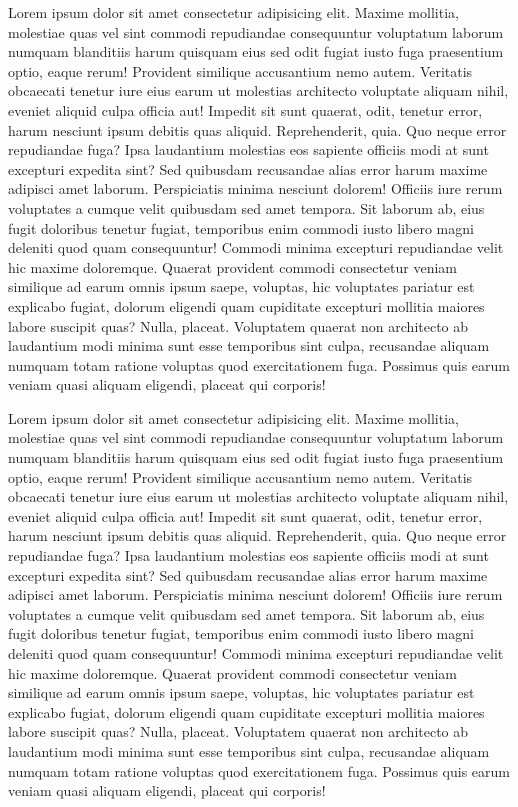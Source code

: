 \documentclass[autowc]{CUP-JNL-PPS}
\begin{document}
Lorem ipsum dolor sit amet consectetur adipisicing elit. Maxime mollitia,
molestiae quas vel sint commodi repudiandae consequuntur voluptatum laborum
numquam blanditiis harum quisquam eius sed odit fugiat iusto fuga praesentium
optio, eaque rerum! Provident similique accusantium nemo autem. Veritatis
obcaecati tenetur iure eius earum ut molestias architecto voluptate aliquam
nihil, eveniet aliquid culpa officia aut! Impedit sit sunt quaerat, odit,
tenetur error, harum nesciunt ipsum debitis quas aliquid. Reprehenderit,
quia. Quo neque error repudiandae fuga? Ipsa laudantium molestias eos
sapiente officiis modi at sunt excepturi expedita sint? Sed quibusdam
recusandae alias error harum maxime adipisci amet laborum. Perspiciatis
minima nesciunt dolorem! Officiis iure rerum voluptates a cumque velit
quibusdam sed amet tempora. Sit laborum ab, eius fugit doloribus tenetur
fugiat, temporibus enim commodi iusto libero magni deleniti quod quam
consequuntur! Commodi minima excepturi repudiandae velit hic maxime
doloremque. Quaerat provident commodi consectetur veniam similique ad
earum omnis ipsum saepe, voluptas, hic voluptates pariatur est explicabo
fugiat, dolorum eligendi quam cupiditate excepturi mollitia maiores labore
suscipit quas? Nulla, placeat. Voluptatem quaerat non architecto ab laudantium
modi minima sunt esse temporibus sint culpa, recusandae aliquam numquam
totam ratione voluptas quod exercitationem fuga. Possimus quis earum veniam
quasi aliquam eligendi, placeat qui corporis!

Lorem ipsum dolor sit amet consectetur adipisicing elit. Maxime mollitia,
molestiae quas vel sint commodi repudiandae consequuntur voluptatum laborum
numquam blanditiis harum quisquam eius sed odit fugiat iusto fuga praesentium
optio, eaque rerum! Provident similique accusantium nemo autem. Veritatis
obcaecati tenetur iure eius earum ut molestias architecto voluptate aliquam
nihil, eveniet aliquid culpa officia aut! Impedit sit sunt quaerat, odit,
tenetur error, harum nesciunt ipsum debitis quas aliquid. Reprehenderit,
quia. Quo neque error repudiandae fuga? Ipsa laudantium molestias eos
sapiente officiis modi at sunt excepturi expedita sint? Sed quibusdam
recusandae alias error harum maxime adipisci amet laborum. Perspiciatis
minima nesciunt dolorem! Officiis iure rerum voluptates a cumque velit
quibusdam sed amet tempora. Sit laborum ab, eius fugit doloribus tenetur
fugiat, temporibus enim commodi iusto libero magni deleniti quod quam
consequuntur! Commodi minima excepturi repudiandae velit hic maxime
doloremque. Quaerat provident commodi consectetur veniam similique ad
earum omnis ipsum saepe, voluptas, hic voluptates pariatur est explicabo
fugiat, dolorum eligendi quam cupiditate excepturi mollitia maiores labore
suscipit quas? Nulla, placeat. Voluptatem quaerat non architecto ab laudantium
modi minima sunt esse temporibus sint culpa, recusandae aliquam numquam
totam ratione voluptas quod exercitationem fuga. Possimus quis earum veniam
quasi aliquam eligendi, placeat qui corporis!
\end{document}

